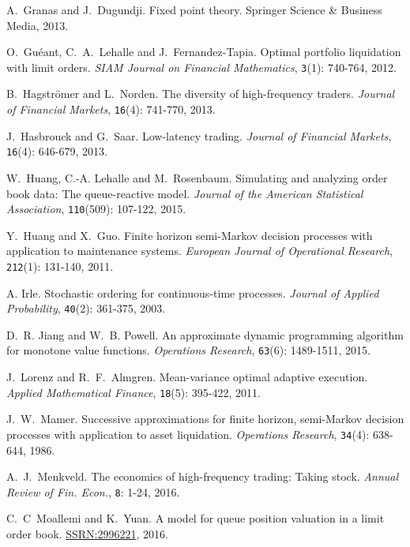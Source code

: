 \documentclass{amsart}[11pt]
\numberwithin{equation}{section}
\theoremstyle{definition}
\begin{document}
\begin{thebibliography}{10}
A.~Granas and J.~Dugundji.
Fixed point theory. 
Springer Science \& Business Media, 2013.

O.~Gu{\'e}ant, C.~A.~Lehalle and J.~Fernandez-Tapia.
Optimal portfolio liquidation with limit orders.
\textit{SIAM Journal on Financial Mathematics}, {\tt 3}(1): 740-764, 2012.

B.~Hagstr{\"o}mer and L.~Norden.
The diversity of high-frequency traders.
\textit{Journal of Financial Markets}, {\tt 16}(4): 741-770, 2013.

J.~Hasbrouck and G.~Saar.
Low-latency trading.
\textit{Journal of Financial Markets}, {\tt 16}(4): 646-679, 2013.

W.~Huang, C.-A. Lehalle and M.~Rosenbaum.
Simulating and analyzing order book data: The queue-reactive model.
\textit{Journal of the American Statistical Association}, {\tt 110}(509): 107-122, 2015.

Y.~Huang and X.~Guo.
Finite horizon semi-Markov decision processes with application to maintenance systems.
\textit{European Journal of Operational Research}, {\tt 212}(1): 131-140, 2011.

A. Irle.
Stochastic ordering for continuous-time processes.
\textit{Journal of Applied Probability}, {\tt 40}(2): 361-375, 2003.

D.~R. Jiang and W.~B. Powell.
An approximate dynamic programming algorithm for monotone value functions.
\textit{Operations Research}, {\tt 63}(6): 1489-1511, 2015.

J.~Lorenz and R.~F.~Almgren.
Mean-variance optimal adaptive execution.
\textit{Applied Mathematical Finance}, {\tt 18}(5): 395-422, 2011.

J.~W.~Mamer.
Successive approximations for finite horizon, semi-Markov decision processes with application to asset liquidation.
\textit{Operations Research}, {\tt34}(4): 638-644, 1986.

A.~J.~Menkveld. 
The economics of high-frequency trading: Taking stock.
\textit{Annual Review of Fin. Econ.}, {\tt 8}: 1-24, 2016.

C.~C~Moallemi and K.~Yuan.
A model for queue position valuation in a limit order book.
\href{https://papers.ssrn.com/sol3/papers.cfm?abstract_id=2996221}{SSRN:2996221}, 
2016.


\end{thebibliography}
\end{document}
